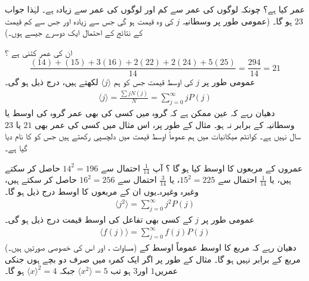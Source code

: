   عمر کیا ہے؟  \quad
چونکہ  لوگوں کی عمر  سے کم اور  لوگوں  کی  عمر  سے زیادہ ہے۔ لہٰذا  جواب \( 23 \) ہو گا۔ (عمومی طور پر وسطانیہ \( j \) کی وہ قیمت ہو گی جس سے زیادہ  اور جس سے کم قیمت کے نتائج کے احتمال  ایک دوسرے جیسے ہوں۔)

\quad
ان  کی   عمر کتنی ہے ؟ 
\[ \frac{(14)+(15)+3(16)+2(22)+2(24)+5(25)}{14} = \frac{294}{14}=21 \]
عمومی طور پر \( j \) کی اوسط قیمت جس کو ہم  \( \langle j \rangle \) لکھتے ہیں، درج ذیل ہو گی۔ 
\begin{align}\label{مساوات_تفاعل_موج_اوسط}
\langle j \rangle = \frac{\sum  j N(j)}{N} = \sum_{j=0}^{\infty} jP(j) 
\end{align}
دھیان رہے کہ عین ممکن ہے کہ گروہ میں کسی کی بھی عمر گروہ کی اوسط یا وسطانیہ  کے برابر نہ ہو۔ مثال کے طور پر،  اس مثال میں کسی کی عمر بھی  \( 21 \) یا \( 23 \) سال نہیں ہے۔ کوانٹم میکانیات میں ہم عموماً اوسط قیمت میں دلچسپی رکھتے ہیں جس کو   کا نام دیا گیا ہے۔ 

\quad عمروں کے مربعوں کا اوسط کیا ہو گا ؟  \quad  آپ \( \frac{1}{14} \) احتمال سے   \( 14^{2} = 196 \)  حاصل کر سکتے ہیں، یا \( \frac{1}{14} \) احتمال سے \( 15^{2} = 225 \)، یا \( \frac{3}{14} \) احتمال سے \( 16^{2} = 256 \) حاصل کر سکتے ہیں، وغیرہ وغیرہ۔یوں ان کے مربعوں کا اوسط درج ذیل ہو گا۔ 
\begin{align}\label{مساوات_تفاعل_موج_اوسط_مربع}
\langle j^{2} \rangle  = \sum_{j=0}^{\infty} j^{2} P(j) 
\end{align}
عمومی طور پر \( j \) کے کسی بھی تفاعل کی اوسط قیمت درج ذیل ہو گی۔ 
\begin{align}
 \langle f(j) \rangle = \sum_{j=0}^{\infty} f(j) P(j) 
\end{align}
(مساوات ،  اور  اس  کی خصوصی صورتیں ہیں۔) دھیان رہے کہ مربع کا اوسط  عموماً اوسط کے مربع  کے برابر نہیں ہو گا۔ مثال کے طور پر اگر ایک کمرہ میں صرف دو بچے ہوں جنکی عمریں\( 1 \) اور\( 3 \) ہو تب 
\( \langle x^{2} \rangle = 5 \)  جبکہ
\( \langle x\rangle ^{2} = 4 \)  ہو گا۔

